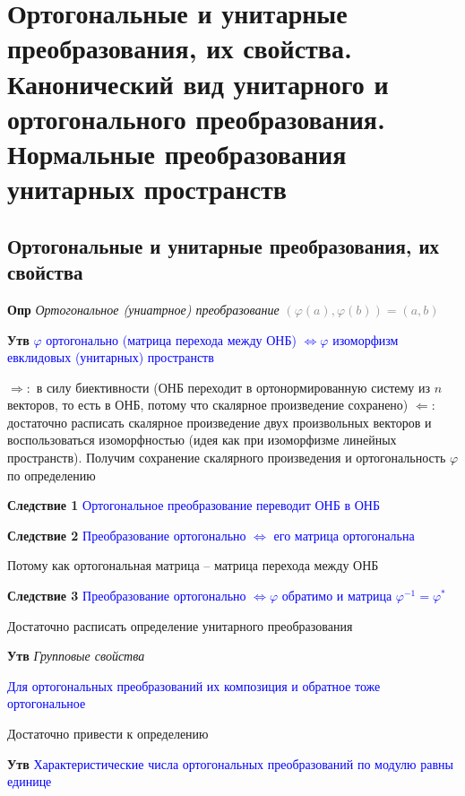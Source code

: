 \documentclass[a4paper, 14pt]{article}
\begin{document}
    \section{Ортогональные и унитарные преобразования, их свойства.
    Канонический вид унитарного и ортогонального преобразования.
    Нормальные преобразования унитарных пространств}

    \subsection{Ортогональные и унитарные преобразования, их свойства}

    \textbf{Опр} \textit{Ортогональное (униатрное) преобразование} \textcolor{gray}{$(\varphi (a), \varphi (b)) = (a, b)$}

    \textbf{Утв} \textcolor{blue}{$\varphi$ ортогонально (матрица перехода между ОНБ) $\Leftrightarrow \varphi$
        изоморфизм евклидовых (унитарных) пространств}

    $\Rightarrow:$ в силу биективности (ОНБ переходит в ортонормированную систему из $n$ векторов, то есть в ОНБ,
    потому что скалярное произведение сохранено)
    $\Leftarrow:$ достаточно расписать скалярное произведение двух произвольных векторов и воспользоваться
    изоморфностью (идея как при изоморфизме линейных пространств).
    Получим сохранение скалярного произведения и ортогональность $\varphi$ по определению

    \textbf{Следствие 1} \textcolor{blue}{Ортогональное преобразование переводит ОНБ в ОНБ}

    \textbf{Следствие 2} \textcolor{blue}{Преобразование ортогонально $\Leftrightarrow$ его матрица ортогональна}

    Потому как ортогональная матрица -- матрица перехода между ОНБ

    \textbf{Следствие 3} \textcolor{blue}{Преобразование ортогонально $\Leftrightarrow \varphi$ обратимо и
    матрица $\varphi^{-1} = \varphi^*$}

    Достаточно расписать определение унитарного преобразования

    \textbf{Утв} \textit{Групповые свойства}

    \textcolor{blue}{Для ортогональных преобразований их композиция и обратное тоже ортогональное}

    Достаточно привести к определению

    \textbf{Утв} \textcolor{blue}{Характеристические числа ортогональных преобразований по модулю равны единице}
\end{document}
